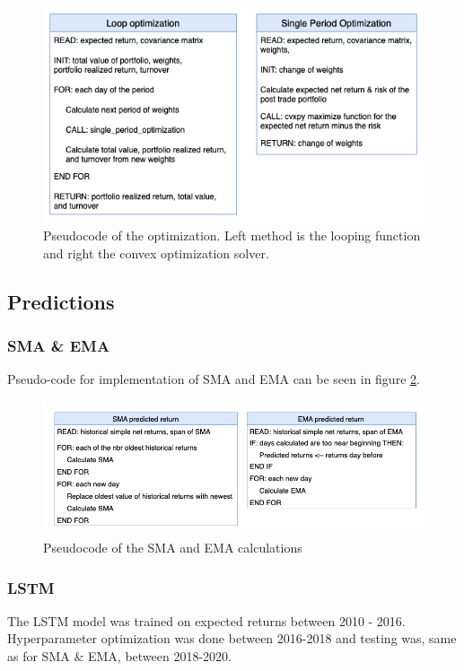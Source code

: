 \documentclass[final]{LTHtwocol} %
\begin{document}

\begin{figure}[h]
	\centering
	\includegraphics[width=1\columnwidth]{Pics/optimizationPseud.png}
	\caption{Pseudocode of the optimization. Left method is the looping function and right the convex optimization solver.}
	\label{fig:optimization} %
\end{figure}
\subsection{Predictions}
\subsubsection{SMA \& EMA}
Pseudo-code for implementation of SMA and EMA can be seen in figure \ref{fig:SMAnEMApseud}.

\begin{figure}[h]
	\centering
	\includegraphics[width=1\columnwidth]{Pics/SMAnEMApseud.png}
	\caption{Pseudocode of the SMA and EMA calculations}
	\label{fig:SMAnEMApseud} %
\end{figure}
\subsubsection{LSTM} The LSTM model was trained on expected returns between 2010 - 2016. Hyperparameter optimization was done between 2016-2018 and testing was, same as for SMA \& EMA, between 2018-2020.
\end{document}
